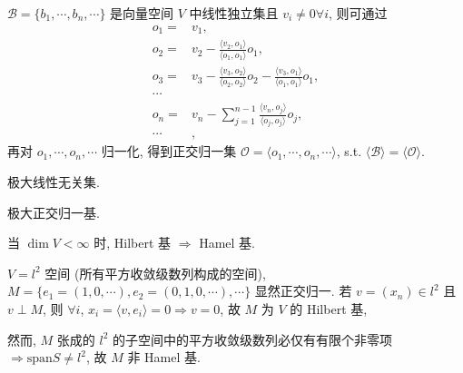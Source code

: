 \documentclass{note}
\begin{document}
\begin{thm}
    $\mathcal{B}=\{b_1,\cdots,b_n,\cdots\}$ 是向量空间 $V$ 中线性独立集且 $v_i\neq 0\forall i$, 则可通过
    \begin{align*}
        o_1=&v_1,\\
        o_2=&v_2-\frac{\langle v_2,o_1\rangle}{\langle o_1,o_1\rangle}o_1,\\
        o_3=&v_3-\frac{\langle v_3,o_2\rangle}{\langle o_2,o_2\rangle}o_2-\frac{\langle v_3,o_1\rangle}{\langle o_1,o_1\rangle}o_1,\\
        \cdots&\\
        o_n=&v_n-\sum_{j=1}^{n-1}\frac{\langle v_n,o_j\rangle}{\langle o_j,o_j\rangle}o_j,\\
        \cdots&,
    \end{align*}
    再对 $o_1,\cdots,o_n,\cdots$ 归一化, 得到正交归一集 $\mathcal{O}=\langle o_1,\cdots,o_n,\cdots\rangle$, s.t. $\langle\mathcal{B}\rangle=\langle\mathcal{O}\rangle$.
\end{thm}

\begin{df}[Hamel 基]
    极大线性无关集.
\end{df}

\begin{df}[Hilbert 基]
    极大正交归一基.
\end{df}

\begin{thm}
    当 $\dim V<\infty$ 时, Hilbert 基 $\Longrightarrow$ Hamel 基.
\end{thm}

\begin{eg}
    $V=l^2$ 空间 (所有平方收敛级数列构成的空间), $M=\{e_1=(1,0,\cdots),e_2=(0,1,0,\cdots),\cdots\}$ 显然正交归一. 若 $v=(x_n)\in l^2$ 且 $v\perp M$, 则 $\forall i$, $x_i=\langle v,e_i\rangle=0\Longrightarrow v=0$, 故 $M$ 为 $V$ 的 Hilbert 基, 

    然而, $M$ 张成的 $l^2$ 的子空间中的平方收敛级数列必仅有有限个非零项 $\Longrightarrow\text{span}S\neq l^2$, 故 $M$ 非 Hamel 基.
\end{eg}
\end{document}
